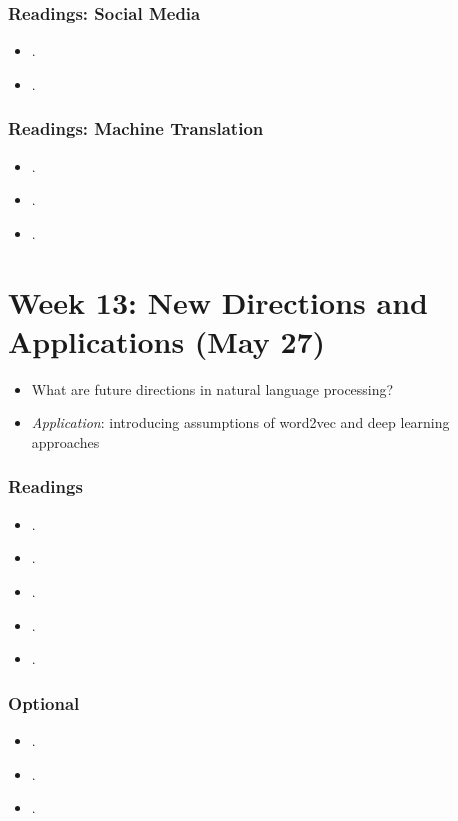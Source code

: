\documentclass[abstract=on,parskip=full,headings=standardclasses,fontsize=11pt,paper=a4]{scrartcl}
\begin{document}
\subsubsection*{Readings: Social Media}
\begin{itemize}
\item {}.
\item {}.
\end{itemize}

\subsubsection*{Readings: Machine Translation}
\begin{itemize}
\item {}.
\item {}.
\item {}.
\end{itemize}


\section{Week 13: New Directions and Applications (May 27)}


\begin{itemize}
\renewcommand\labelitemi{--}
\item What are future directions in natural language processing?
\item \textit{Application}: introducing assumptions of word2vec and deep learning approaches
\end{itemize}

\subsubsection*{Readings}
\begin{itemize}
\item {}.
\item {}.
\item {}.
\item {}.
\item {}.
\end{itemize}

\subsubsection*{Optional}

\begin{itemize}
\item {}.
\item {}.
\item {}.
\end{itemize}


\sloppy
\renewcommand*{\bibfont}{\small}

\setlength{\bibitemsep}{0.2em} %
\printbibliography

\bigskip

\end{document}
